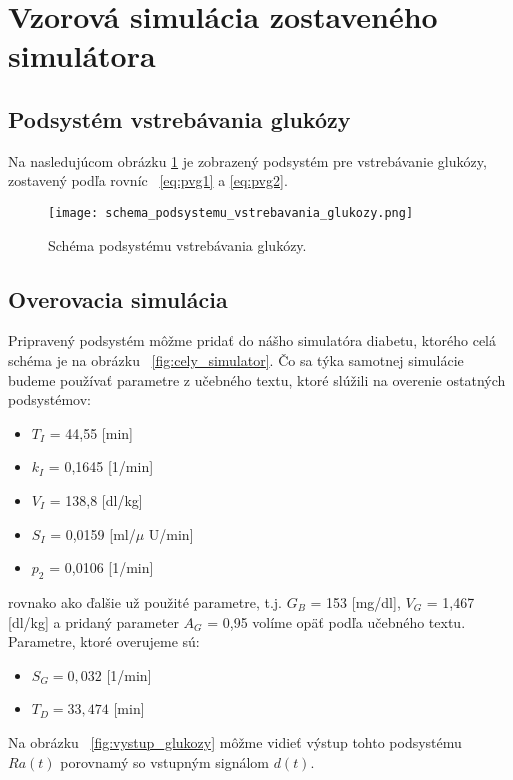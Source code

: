 \documentclass[11pt]{article} %
\begin{document}
\newpage

\section{Vzorová simulácia zostaveného simulátora}

\subsection{Podsystém vstrebávania glukózy}

Na nasledujúcom obrázku \ref{fig:schema_glukozy} je zobrazený podsystém pre vstrebávanie glukózy, zostavený podľa rovníc ~\ref{eq:pvg1} a \ref{eq:pvg2}.

\begin{figure}[h]
	\centering
	\texttt{[image: schema\_podsystemu\_vstrebavania\_glukozy.png]} 
	\caption{Schéma podsystému vstrebávania glukózy.}
	\label{fig:schema_glukozy}
\end{figure}

\subsection{Overovacia simulácia}

Pripravený podsystém môžme pridať do nášho simulatóra diabetu, ktorého celá schéma je na obrázku ~\ref{fig:cely_simulator}. Čo sa týka samotnej simulácie budeme používať parametre z učebného textu, ktoré slúžili na overenie ostatných podsystémov:
\begin{itemize}
\item $T_I$ = 44,55 [min]
\item $k_I$ = 0,1645 [1/min]
\item $V_I$ = 138,8 [dl/kg]
\item $S_I$ = 0,0159 [ml/$\mu$ U/min]
\item $p_2$ = 0,0106 [1/min]
\end{itemize}
rovnako ako ďalšie už použité parametre, t.j. $G_B$ = 153 [mg/dl], $V_G$ = 1,467 [dl/kg] a pridaný parameter $A_G$ = 0,95 volíme opäť podľa učebného textu. Parametre, ktoré overujeme sú:
\begin{itemize}
\item $S_G = 0,032$ [1/min]
\item $T_D = 33,474$ [min]
\end{itemize}

Na obrázku ~\ref{fig:vystup_glukozy} môžme vidieť výstup tohto podsystému $Ra(t)$ porovnamý so vstupným signálom $d(t)$. 
\end{document}

